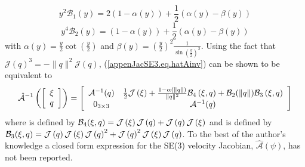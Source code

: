 %
\begin{equation}
y^2 \mathcal{B}_1\left( y \right)=2\left(1-\alpha(y)\right)+\frac{1}{2}\left(\alpha(y)-\beta(y)\right)
\end{equation}
%
\begin{equation}
y^4 \mathcal{B}_2\left( y \right)=\left(1-\alpha(y)\right)+\frac{1}{2}\left(\alpha(y)-\beta(y)\right)
\end{equation}
%
with $\alpha(y)=\frac{y}{2}\cot\left( \frac{y}{2}\right)$
and $\beta(y)=\left(\frac{y}{2}\right)^2\frac{1}{\sin\left(\frac{y}{2}\right)^2}$.
Using the fact that $\mathcal{J}(q)^3=-\|q\|^2 \mathcal{J}(q)$,
(\ref{appenJacSE3.eq.hatAinv}) can be shown to be equivalent to
%
\begin{equation}\label{appenJacSE3.eq.hatAinv2} 
 \hat{\mathcal{A}}^{-1}\left(\left[ \begin{array}{c} 
\xi \\ q  \\
\end{array} \right]\right)
=\left[ \begin{array}{cc}
     \mathcal{A}^{-1}(q) &  \frac{1}{2}\mathcal{J}\left( \xi \right) + 
                           \frac{1-\alpha(\|q\|)}{\|q\|^2}\mathcal{B}_4\left( \xi, q\right) 
                           +\mathcal{B}_2(\|q\|)\mathcal{B}_3\left( \xi, q\right)   \\
      0_{3 \times 3}     & \mathcal{A}^{-1}(q)    \\
\end{array} \right]
\end{equation}
%
\noindent where 
 is defined by
$\mathcal{B}_4(\xi,q)=\mathcal{J}\left( \xi \right)\mathcal{J}\left( q \right)+\mathcal{J}\left( q \right)\mathcal{J}\left( \xi \right)$ and
 is defined
by
$\mathcal{B}_3(\xi,q)=\mathcal{J}\left( q \right)\mathcal{J}\left( \xi \right)\mathcal{J}\left( q \right)^2+\mathcal{J}\left( q \right)^2\mathcal{J}\left( \xi \right)\mathcal{J}\left( q \right)$.
To the best of the author's knowledge a closed form expression for the
SE(3) velocity Jacobian, $\hat{\mathcal{A}}\left(\psi\right)$,
has not been reported.  
